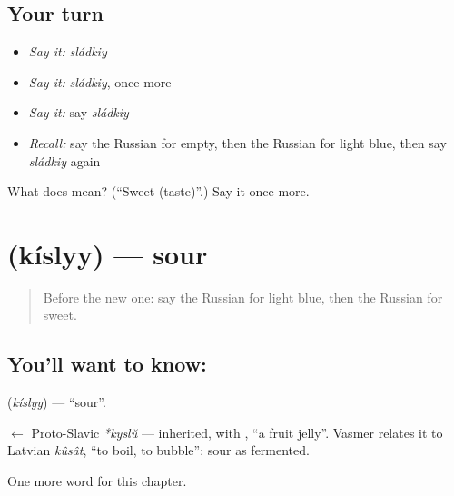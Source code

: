 \subsection*{Your turn}
\begin{itemize}
\raggedright
  \item \emph{Say it:} \emph{sládkiy}
  \item \emph{Say it:} \emph{sládkiy}, once more
  \item \emph{Say it:} say \emph{sládkiy}
  \item \emph{Recall:} say the Russian for empty, then the Russian for light blue, then say \emph{sládkiy} again
\end{itemize}

\begin{tcolorbox}[breakable,colback=teal!4,colframe=teal!35!black,title={Before you move on}]
What does  mean? (\textquotedblleft{}Sweet (taste)\textquotedblright{}.) Say it once more.
\end{tcolorbox}
\section[\texorpdfstring{\ru{кислый} (kíslyy)}{кислый (kíslyy)}]{ (kíslyy) — sour}

\label{lesson:RU-C157-kislyy}



\begin{quote}
Before the new one: say the Russian for light blue, then the Russian for sweet.
\end{quote}

\subsection*{You'll want to know: }
\textbf{} (\emph{kíslyy}) — \textquotedblleft{}sour\textquotedblright{}.

\begin{cousinweb}
\textbf{} $\leftarrow$ Proto-Slavic \emph{*kyslŭ} — inherited, with \emph{}, \textquotedblleft{}a fruit jelly\textquotedblright{}. Vasmer relates it to Latvian \emph{kûsât}, \textquotedblleft{}to boil, to bubble\textquotedblright{}: sour as fermented.
\end{cousinweb}

\begin{grammarlens}[title={What you've built}]
One more word for this chapter.
\end{grammarlens}

